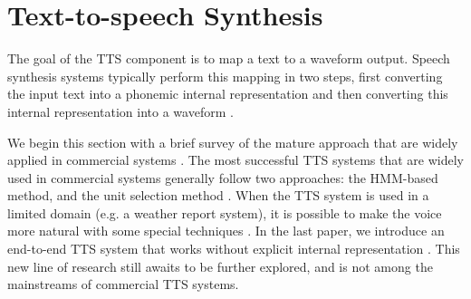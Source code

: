 \section{Text-to-speech Synthesis} \label{Text-to-speech Synthesis}

The goal of the TTS component is to map a text to a waveform output. Speech synthesis systems typically perform this mapping in two steps, first converting the input text into a phonemic internal representation and then converting this internal representation into a waveform \cite{Jurafsky2006}.

We begin this section with a brief survey of the mature approach that are widely applied in commercial systems \cite{Jurafsky2006}. The most successful TTS systems that are widely used in commercial systems generally follow two approaches: the HMM-based method, and the unit selection method \cite{Black97}. When the TTS system is used in a limited domain (e.g. a weather report system), it is possible to make the voice more natural with some special techniques \cite{Black2000}. In the last paper, we introduce an end-to-end TTS system that works without explicit internal representation \cite{Wu2016Investigating}. This new line of research still awaits to be further explored, and is not among the mainstreams of commercial TTS systems.





